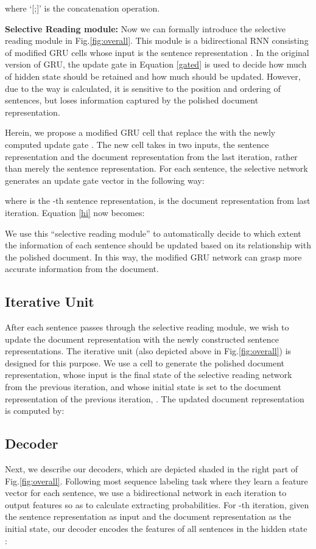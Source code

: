 \documentclass[11pt,a4paper]{article}
\begin{document}
where `[;]' is the concatenation operation.

\textbf{Selective Reading module: } 
Now we can formally introduce the selective reading module in Fig.\ref{fig:overall}. 
This module is a bidirectional RNN consisting of modified GRU cells whose input is the sentence representation .
In the original version of GRU, the update gate  in Equation \ref{gated} is used to decide how much of hidden state should be retained and how much should be updated. 
However, due to the way  is calculated, it is sensitive to the position and ordering of sentences, but loses information captured by the polished document representation.

Herein, we propose a modified GRU cell that replace the  with the newly computed update gate . The new cell takes in two inputs, the sentence representation and the document representation from the last iteration, rather than merely the sentence representation. For each sentence, the selective network generates an update gate vector  in the following way:

where   is the -th sentence representation,  is the document representation from last iteration. Equation \ref{hi} now becomes:


We use this ``selective reading module'' to automatically decide to which extent the information of each sentence should be updated based on its relationship with the polished document. In this way, the modified GRU network can grasp more accurate information from the document.


\subsection{Iterative Unit}
After each sentence passes through the selective reading module, we wish to update the document representation  with the newly constructed sentence representations. 
The iterative unit (also depicted above in Fig.\ref{fig:overall}) is designed for this purpose.
We use a  cell to generate the polished document representation, whose input is the final state of the selective reading network from the previous iteration,  and whose initial state is set to the document representation of the previous iteration, .  The updated document representation is computed by:


\subsection{Decoder}
Next, we describe our decoders, which are depicted shaded in the right part of Fig.\ref{fig:overall}. 
Following most sequence labeling task \cite{xue2004calibrating,Carreras:2005:ICS:1706543.1706571} where they learn a feature vector for each sentence, we use a bidirectional  network in each iteration to output features so as to calculate extracting probabilities.
For -th iteration, given the sentence representation  as input and the document representation  as the initial state,
our decoder encodes the features of all sentences in the hidden state :
\end{document}
